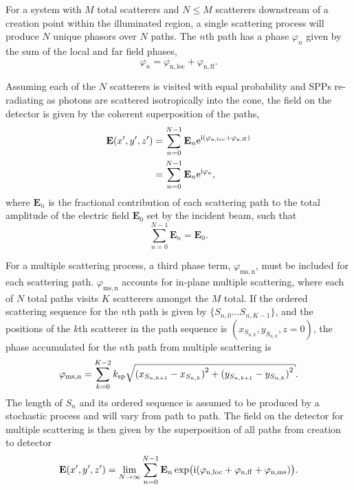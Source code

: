 For a system with $M$ total scatterers and $N \leq M$ scatterers downstream of
a creation point within the illuminated region, a single scattering process
will produce $N$ unique phasors over $N$ paths.  The $n$th path has a
phase $\varphi_n$ given by the sum of the local and far field phases,
\begin{equation}
\varphi_n = \varphi_\mathrm{n,loc}+\varphi_\mathrm{n,ff}.
\end{equation}

Assuming each of the $N$ scatterers is visited with equal probability and SPPs
re-radiating as photons are scattered isotropically into the cone, the field
on the detector is given by the coherent superposition of the paths,
\begin{align}
\mathbf{E}(x^\prime,y^\prime,z^\prime) &=
\sum_{n=0}^{N-1}
\mathbf{E}_n {\mathrm{e}}^{{\mathrm{i}}{(\varphi_\mathrm{n,loc}+\varphi_\mathrm{n,ff})}}\\
&=
\sum_{n=0}^{N-1}
\mathbf{E}_n {\mathrm{e}}^{{\mathrm{i}}{\varphi_\mathrm{n}}},
\end{align}
where $\mathbf{E}_n$ is the fractional contribution of each scattering path to
the total amplitude of the electric field $\mathbf{E}_0$ set by the incident
beam, such that
\begin{equation}
\sum_{n=0}^{N-1}\mathbf{E}_n = \mathbf{E}_0.
\end{equation}

For a multiple scattering process, a third phase term,
$\varphi_\mathrm{ms,n}$, must be included for each scattering path.
$\varphi_\mathrm{ms,n}$ accounts for in-plane multiple scattering, where each
of $N$ total paths visits $K$ scatterers amongst the $M$ total.  If the
ordered scattering sequence for the $n$th path is given by $\{S_{n,0} \ldots
S_{n,{K-1}}\}$, and the positions of the $k$th scatterer in the path sequence
is $(x_{S_{n,k}},y_{S_{n,k}},z=0)$, the phase accumulated for the $n$th path from
multiple scattering is
\begin{equation}
\varphi_\mathrm{ms,n}=\sum_{k=0}^{K-2}
\ksp \sqrt{{(x_{S_{n,{k+1}}}-x_{S_{n,k}})}^2+{(y_{S_{n,{k+1}}}-y_{S_{n,k}})}^2}.
\label{eqn:multiplescatteringphase}
\end{equation}
The length of $S_n$ and its ordered sequence is assumed to be produced by a stochastic
process and will vary from path to path.  The field on the detector
for multiple scattering is then given by the superposition of all paths from
creation to detector
\begin{equation}
\mathbf{E}(x^\prime,y^\prime,z^\prime) =
\lim_{N\to\infty}
\sum_{n=0}^{N-1}
\mathbf{E}_n
\exp\!\big({{\mathrm{i}}{(\varphi_\mathrm{n,loc}+\varphi_\mathrm{n,ff}+\varphi_\mathrm{n,ms})}}\big).
\label{eqn:smicromsphase}
\end{equation}

